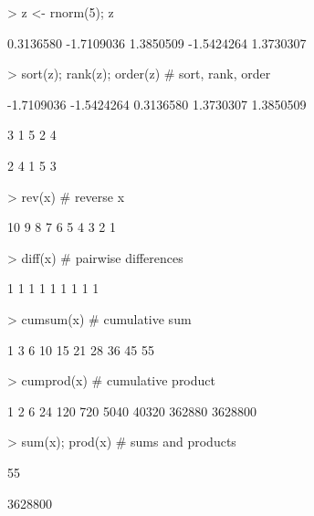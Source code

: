 \begin{Schunk}
\begin{Sinput}
> z <- rnorm(5); z
\end{Sinput}
\begin{Soutput}
[1]  0.3136580 -1.7109036  1.3850509 -1.5424264  1.3730307
\end{Soutput}
\begin{Sinput}
> sort(z); rank(z); order(z)              # sort, rank, order
\end{Sinput}
\begin{Soutput}
[1] -1.7109036 -1.5424264  0.3136580  1.3730307  1.3850509
\end{Soutput}
\begin{Soutput}
[1] 3 1 5 2 4
\end{Soutput}
\begin{Soutput}
[1] 2 4 1 5 3
\end{Soutput}
\begin{Sinput}
> rev(x)                                  # reverse x
\end{Sinput}
\begin{Soutput}
 [1] 10  9  8  7  6  5  4  3  2  1
\end{Soutput}
\end{Schunk}

\begin{Schunk}
\begin{Sinput}
> diff(x)                                 # pairwise differences
\end{Sinput}
\begin{Soutput}
[1] 1 1 1 1 1 1 1 1 1
\end{Soutput}
\begin{Sinput}
> cumsum(x)                               # cumulative sum
\end{Sinput}
\begin{Soutput}
 [1]  1  3  6 10 15 21 28 36 45 55
\end{Soutput}
\begin{Sinput}
> cumprod(x)                              # cumulative product
\end{Sinput}
\begin{Soutput}
 [1]       1       2       6      24     120     720    5040   40320  362880 3628800
\end{Soutput}
\begin{Sinput}
> sum(x); prod(x)                         # sums and products
\end{Sinput}
\begin{Soutput}
[1] 55
\end{Soutput}
\begin{Soutput}
[1] 3628800
\end{Soutput}
\end{Schunk}
\label{r:sumprod}%

